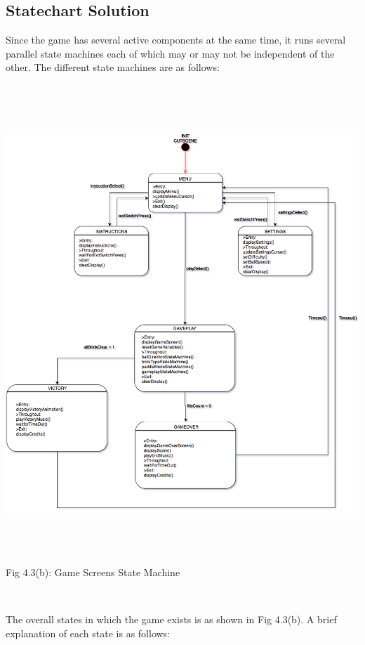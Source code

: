 \documentclass[a4paper,12pt,oneside]{book}
\begin{document}
\subsection{Statechart Solution}
\qquad Since the game has several active components at the same time, it runs several parallel state machines each of which may or may not be independent of the other. The different state machines are as follows:
\begin{center}
\includegraphics[width=14cm, height=18cm]{BreakoutImages/gameStateMachine} \\
\caption{Fig 4.3(b): Game Screens State Machine} \\
\end{center}
\newpage
\qquad The overall states in which the game exists is as shown in Fig 4.3(b). A brief explanation of each state is as follows:
\end{document}
